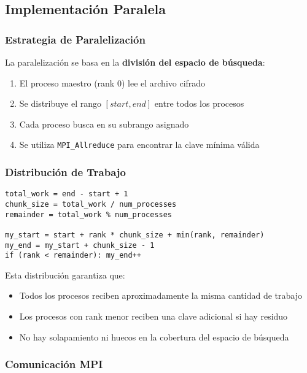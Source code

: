 \documentclass[12pt,letterpaper]{article}
\begin{document}
\subsection{Implementación Paralela}

\subsubsection{Estrategia de Paralelización}

La paralelización se basa en la \textbf{división del espacio de búsqueda}:

\begin{enumerate}
    \item El proceso maestro (rank 0) lee el archivo cifrado
    \item Se distribuye el rango $[start, end]$ entre todos los procesos
    \item Cada proceso busca en su subrango asignado
    \item Se utiliza \texttt{MPI\_Allreduce} para encontrar la clave mínima válida
\end{enumerate}

\subsubsection{Distribución de Trabajo}

\begin{lstlisting}[caption=División del espacio de búsqueda, label=lst:work-division]
total_work = end - start + 1
chunk_size = total_work / num_processes
remainder = total_work % num_processes

my_start = start + rank * chunk_size + min(rank, remainder)
my_end = my_start + chunk_size - 1
if (rank < remainder): my_end++
\end{lstlisting}

Esta distribución garantiza que:
\begin{itemize}
    \item Todos los procesos reciben aproximadamente la misma cantidad de trabajo
    \item Los procesos con rank menor reciben una clave adicional si hay residuo
    \item No hay solapamiento ni huecos en la cobertura del espacio de búsqueda
\end{itemize}

\subsubsection{Comunicación MPI}
\end{document}
